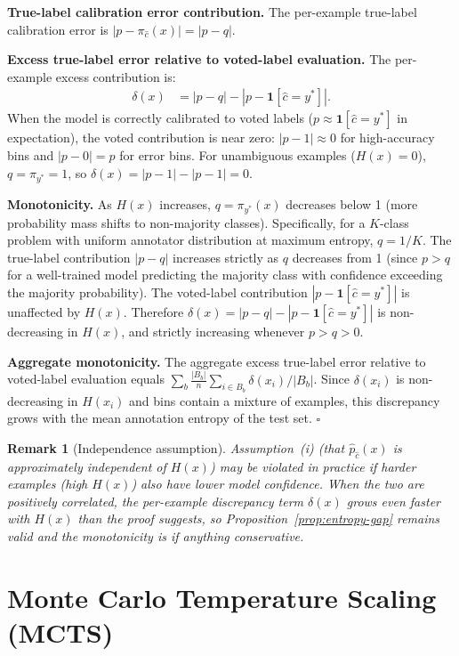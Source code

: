 \documentclass[10pt,journal,compsoc]{IEEEtran}
\newcommand{\phat}{\hat{p}}
\newtheorem{remark}{Remark}
\begin{document}
\noindent\textbf{True-label calibration error contribution.}
The per-example true-label calibration error is $|p - \pi_{\hat{c}}(x)|=|p-q|$.

\noindent\textbf{Excess true-label error relative to voted-label evaluation.}
The per-example excess contribution is:
\begin{align}
  \delta(x) &= |p - q| - |p - \mathbf{1}[\hat{c}=y^*]|.
\end{align}
When the model is correctly calibrated to voted labels ($p\approx\mathbf{1}[\hat{c}=y^*]$ in expectation), the voted contribution is near zero: $|p-1|\approx 0$ for high-accuracy bins and $|p-0|=p$ for error bins.  For unambiguous examples ($H(x)=0$), $q=\pi_{y^*}=1$, so $\delta(x)=|p-1|-|p-1|=0$.

\noindent\textbf{Monotonicity.}
As $H(x)$ increases, $q=\pi_{y^*}(x)$ decreases below 1 (more probability mass shifts to non-majority classes).  Specifically, for a $K$-class problem with uniform annotator distribution at maximum entropy, $q=1/K$.  The true-label contribution $|p-q|$ increases strictly as $q$ decreases from 1 (since $p>q$ for a well-trained model predicting the majority class with confidence exceeding the majority probability).  The voted-label contribution $|p-\mathbf{1}[\hat{c}=y^*]|$ is unaffected by $H(x)$.  Therefore $\delta(x)=|p-q|-|p-\mathbf{1}[\hat{c}=y^*]|$ is non-decreasing in $H(x)$, and strictly increasing whenever $p>q>0$.

\noindent\textbf{Aggregate monotonicity.}
The aggregate excess true-label error relative to voted-label evaluation equals $\sum_b\frac{|B_b|}{n}\sum_{i\in B_b}\delta(x_i)/|B_b|$.  Since $\delta(x_i)$ is non-decreasing in $H(x_i)$ and bins contain a mixture of examples, this discrepancy grows with the mean annotation entropy of the test set.  $\square$

\begin{remark}[Independence assumption]
Assumption~(i) (that $\phat_{\hat{c}}(x)$ is approximately independent of $H(x)$) may be violated in practice if harder examples (high $H(x)$) also have lower model confidence.  When the two are positively correlated, the per-example discrepancy term $\delta(x)$ grows even faster with $H(x)$ than the proof suggests, so Proposition~\ref{prop:entropy-gap} remains valid and the monotonicity is if anything \emph{conservative}.
\end{remark}

\section{Monte Carlo Temperature Scaling (MCTS)}
\label{app:mcts-convergence}
\end{document}
